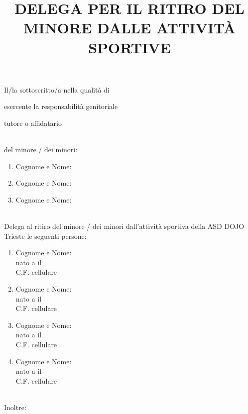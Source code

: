 \documentclass{djtsmod}
\title{DELEGA PER IL RITIRO DEL MINORE DALLE ATTIVITÀ SPORTIVE}
\begin{document}
	\maketitle
	
	Il/la sottoscritto/a \fieldfill\; nella qualità di
	\begin{radiolist}
		\item esercente la responsabilità genitoriale  
		\item tutore o affidatario
	\end{radiolist}\ \\
	del minore / dei minori: \\
	\begin{minipage}{0.8\textwidth}
		\begin{enumerate}
			\item Cognome e Nome: \fieldfill
			\item Cognome e Nome: \fieldfill
			\item Cognome e Nome: \fieldfill
		\end{enumerate}
	\end{minipage} \\[20pt]
	Delega al ritiro del minore / dei minori dall'attività sportiva della ASD DOJO Trieste le seguenti persone: \\
	\begin{minipage}{0.8\linewidth}
		\begin{enumerate}
			\item Cognome e Nome: \fieldfill \\
			nato a \field{6cm} il \fieldfill \\
			C.F. \field{6cm} cellulare \fieldfill
			\item Cognome e Nome: \fieldfill \\
			nato a \field{6cm} il \fieldfill \\
			C.F. \field{6cm} cellulare \fieldfill
			\item Cognome e Nome: \fieldfill \\
			nato a \field{6cm} il \fieldfill \\
			C.F. \field{6cm} cellulare \fieldfill
			\item Cognome e Nome: \fieldfill \\
			nato a \field{6cm} il \fieldfill \\
			C.F. \field{6cm} cellulare \fieldfill
		\end{enumerate}
	\end{minipage}\\[10pt]
	Inoltre:
\end{document}
